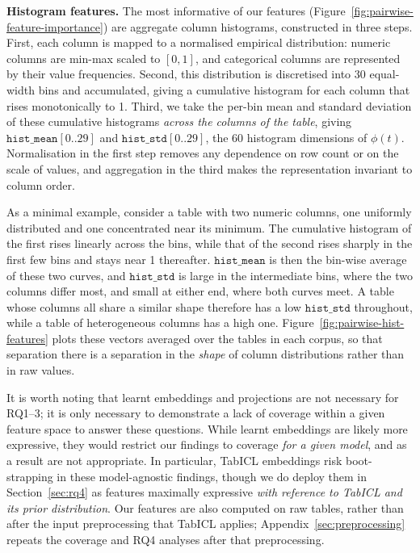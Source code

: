 \documentclass{article}
\begin{document}
\textbf{Histogram features.} The most informative of our features (Figure~\ref{fig:pairwise-feature-importance}) are aggregate column histograms, constructed in three steps.
First, each column is mapped to a normalised empirical distribution: numeric columns are min-max scaled to $[0, 1]$, and categorical columns are represented by their value frequencies.
Second, this distribution is discretised into 30 equal-width bins and accumulated, giving a cumulative histogram for each column that rises monotonically to 1.
Third, we take the per-bin mean and standard deviation of these cumulative histograms \textit{across the columns of the table}, giving $\texttt{hist\_mean}[0..29]$ and $\texttt{hist\_std}[0..29]$, the 60 histogram dimensions of $\phi(t)$.
Normalisation in the first step removes any dependence on row count or on the scale of values, and aggregation in the third makes the representation invariant to column order.

As a minimal example, consider a table with two numeric columns, one uniformly distributed and one concentrated near its minimum. The cumulative histogram of the first rises linearly across the bins, while that of the second rises sharply in the first few bins and stays near 1 thereafter. $\texttt{hist\_mean}$ is then the bin-wise average of these two curves, and $\texttt{hist\_std}$ is large in the intermediate bins, where the two columns differ most, and small at either end, where both curves meet.
A table whose columns all share a similar shape therefore has a low $\texttt{hist\_std}$ throughout, while a table of heterogeneous columns has a high one.
Figure~\ref{fig:pairwise-hist-features} plots these vectors averaged over the tables in each corpus, so that separation there is a separation in the \textit{shape} of column distributions rather than in raw values.

It is worth noting that learnt embeddings and projections are not necessary for RQ1--3; it is only necessary to demonstrate a lack of coverage within a given feature space to answer these questions.
While learnt embeddings are likely more expressive, they would restrict our findings to coverage \textit{for a given model}, and as a result are not appropriate.
In particular, TabICL embeddings risk boot-strapping in these model-agnostic findings, though we do deploy them in Section~\ref{sec:rq4} as features maximally expressive \textit{with reference to TabICL and its prior distribution}.
Our features are also computed on raw tables, rather than after the input preprocessing that TabICL applies; Appendix~\ref{sec:preprocessing} repeats the coverage and RQ4 analyses after that preprocessing.
\end{document}
